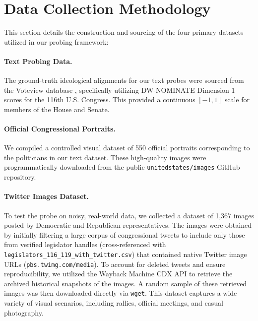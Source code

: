 \documentclass{article}
\begin{document}
{
\small


}

\appendix

\section{Data Collection Methodology}
\label{app:data_collection}

This section details the construction and sourcing of the four primary datasets utilized in our probing framework:

\paragraph{Text Probing Data.} The ground-truth ideological alignments for our text probes were sourced from the Voteview database \citep{pooleSpatialModelsParliamentary2005, mccartyDefenseDWNOMINATE2016}, specifically utilizing DW-NOMINATE Dimension 1 scores for the 116th U.S. Congress. This provided a continuous $[-1, 1]$ scale for members of the House and Senate. 

\paragraph{Official Congressional Portraits.} We compiled a controlled visual dataset of 550 official portraits corresponding to the politicians in our text dataset. These high-quality images were programmatically downloaded from the public \texttt{unitedstates/images} GitHub repository.

\paragraph{Twitter Images Dataset.} To test the probe on noisy, real-world data, we collected a dataset of 1,367 images posted by Democratic and Republican representatives. The images were obtained by initially filtering a large corpus of congressional tweets to include only those from verified legislator handles (cross-referenced with \texttt{legislators\_116\_119\_with\_twitter.csv}) that contained native Twitter image URLs (\texttt{pbs.twimg.com/media}). To account for deleted tweets and ensure reproducibility, we utilized the Wayback Machine CDX API to retrieve the archived historical snapshots of the images. A random sample of these retrieved images was then downloaded directly via \texttt{wget}. This dataset captures a wide variety of visual scenarios, including rallies, official meetings, and casual photography.
\end{document}
